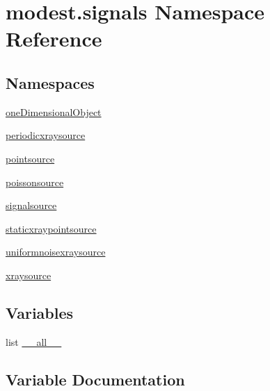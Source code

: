 \hypertarget{namespacemodest_1_1signals}{}\section{modest.\+signals Namespace Reference}
\label{namespacemodest_1_1signals}
\subsection*{Namespaces}
\begin{DoxyCompactItemize}
\item 
 \hyperlink{namespacemodest_1_1signals_1_1oneDimensionalObject}{one\+Dimensional\+Object}
\item 
 \hyperlink{namespacemodest_1_1signals_1_1periodicxraysource}{periodicxraysource}
\item 
 \hyperlink{namespacemodest_1_1signals_1_1pointsource}{pointsource}
\item 
 \hyperlink{namespacemodest_1_1signals_1_1poissonsource}{poissonsource}
\item 
 \hyperlink{namespacemodest_1_1signals_1_1signalsource}{signalsource}
\item 
 \hyperlink{namespacemodest_1_1signals_1_1staticxraypointsource}{staticxraypointsource}
\item 
 \hyperlink{namespacemodest_1_1signals_1_1uniformnoisexraysource}{uniformnoisexraysource}
\item 
 \hyperlink{namespacemodest_1_1signals_1_1xraysource}{xraysource}
\end{DoxyCompactItemize}
\subsection*{Variables}
\begin{DoxyCompactItemize}
\item 
list \hyperlink{namespacemodest_1_1signals_aa31151680eba696b8f6eb7877a67adac}{\+\_\+\+\_\+all\+\_\+\+\_\+}
\end{DoxyCompactItemize}


\subsection{Variable Documentation}

